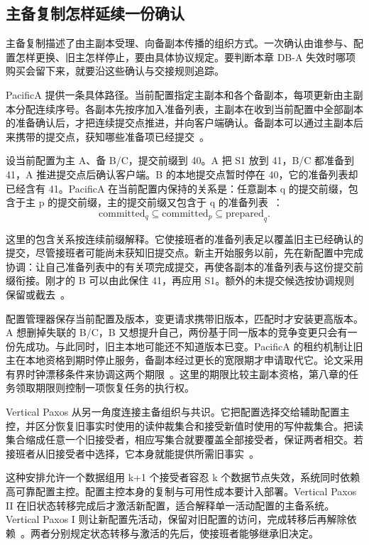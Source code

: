 \subsection*{主备复制怎样延续一份确认}

主备复制描述了由主副本受理、向备副本传播的组织方式。一次确认由谁参与、配置怎样更换、旧主怎样停止，要由具体协议规定。要判断本章 DB-A 失效时哪项购买会留下来，就要沿这些确认与交接规则追踪。

PacificA 提供一条具体路径。当前配置指定主副本和各个备副本，每项更新由主副本分配连续序号。各副本先按序加入准备列表，主副本在收到当前配置中全部副本的准备确认后，才把连续提交点推进，并向客户端确认。备副本可以通过主副本后来携带的提交点，获知哪些准备项已经提交~\cite{pacifica}。

设当前配置为主 A、备 B/C，提交前缀到 40。A 把 S1 放到 41，B/C 都准备到 41，A 推进提交点后确认客户端。B 的本地提交点暂时停在 40，它的准备列表却已经含有 41。PacificA 在当前配置内保持的关系是：任意副本 q 的提交前缀，包含于主 p 的提交前缀，主的提交前缀又包含于 q 的准备列表~\cite{pacifica}：
\[
  \mathrm{committed}_q\subseteq
  \mathrm{committed}_p\subseteq
  \mathrm{prepared}_q.
\]

这里的包含关系按连续前缀解释。它使接班者的准备列表足以覆盖旧主已经确认的提交，尽管接班者可能尚未获知旧提交点。新主开始服务以前，先在新配置中完成协调：让自己准备列表中的有关项完成提交，再使各副本的准备列表与这份提交前缀衔接。刚才的 B 可以由此保住 41，再应用 S1。额外的未提交候选按协调规则保留或截去~\cite{pacifica}。


配置管理器保存当前配置及版本，变更请求携带旧版本，匹配时才安装更高版本。A 想删掉失联的 B/C，B 又想提升自己，两份基于同一版本的竞争变更只会有一份先成功。与此同时，旧主本地可能还不知道版本已变。PacificA 的租约机制让旧主在本地资格到期时停止服务，备副本经过更长的宽限期才申请取代它。论文采用有界时钟漂移条件来协调这两个期限~\cite{pacifica}。这里的期限比较主副本资格，第八章的任务领取期限则控制一项恢复任务的执行权。

Vertical Paxos 从另一角度连接主备组织与共识。它把配置选择交给辅助配置主控，并区分恢复旧事实时使用的读仲裁集合和接受新值时使用的写仲裁集合。把读集合缩成任意一个旧接受者，相应写集合就要覆盖全部接受者，保证两者相交。若接班者从旧接受者中选择，它本身就能提供所需旧事实~\cite{vertical-paxos}。

这种安排允许一个数据组用 k+1 个接受者容忍 k 个数据节点失效，系统同时依赖高可靠配置主控。配置主控本身的复制与可用性成本要计入部署。Vertical Paxos II 在旧状态转移完成后才激活新配置，适合解释单一活动配置的主备系统。Vertical Paxos I 则让新配置先活动，保留对旧配置的访问，完成转移后再解除依赖~\cite{vertical-paxos}。两者分别规定状态转移与激活的先后，使接班者能够继承旧决定。

